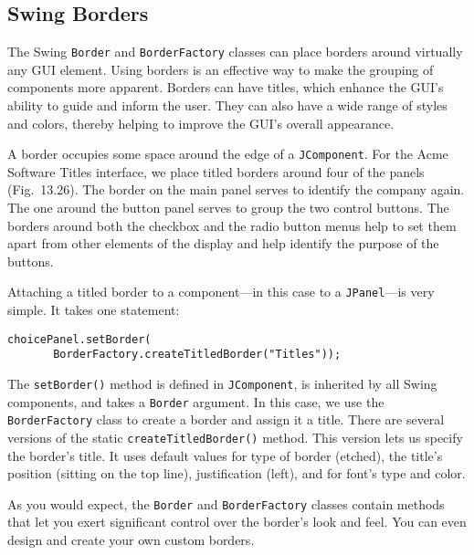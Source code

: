 
\subsection{Swing Borders}
\noindent The Swing {\tt Border} and {\tt BorderFactory} classes can place
borders around virtually any GUI element. Using borders is an
effective way to make the grouping of components more
apparent. Borders can have titles, which enhance the GUI's ability to
guide and inform the user. They can also have a wide range of styles
and colors, thereby helping to improve the GUI's overall appearance.



A border occupies some space around the edge of a
{\tt JComponent}. For the Acme Software Titles interface, we place titled borders around
four of the panels (Fig.~13.26). The border on the
main panel serves to identify the company again. The one around the
button panel serves to group the two control buttons. The borders
around both the checkbox and the radio button menus help to set them
apart from other elements of the display and help identify the
purpose of the buttons.


Attaching a titled border to a component---in this case to a
{\tt JPanel}---is very simple. It takes one statement:

\begin{jjjlisting}
\begin{lstlisting}
choicePanel.setBorder(
       BorderFactory.createTitledBorder("Titles"));
\end{lstlisting}
\end{jjjlisting}

\noindent The {\tt setBorder()} method is defined in {\tt JComponent},
is inherited by all Swing components, and takes a {\tt Border}
argument. In this case, we use the {\tt BorderFactory} class to create
a border and assign it a title.  There are several versions of the static
{\tt createTitledBorder()} method. This version lets us specify the
border's title. It uses default values for type of border (etched),
the title's position (sitting on the top line), justification
(left), and for font's type and color.

As you would expect, the {\tt Border} and {\tt BorderFactory} classes
contain methods that let you exert significant control over the
border's look and feel. You can even design and create your own custom
borders.

